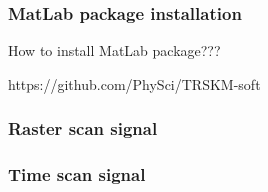 \documentclass[14pt,a4paper] {article}
\begin{document}

\subsubsection{MatLab package installation}
How to install MatLab package???

https://github.com/PhySci/TRSKM-soft


\subsubsection{Raster scan signal}


\subsubsection{Time scan signal}
\end{document}
